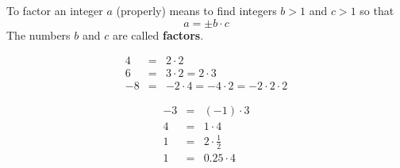 \begin{frame}
\vskip -0.1cm
\begin{definition}
To factor an integer $a$ (properly) means to find integers $b > 1$ and $c > 1$ so that 
\[
a = \pm b\cdot c
\]
The numbers $b$ and $c$ are called \textbf{factors}.
\end{definition}
\begin{example}
\[
\begin{array}{rcl}
4&=& 2\cdot 2\\
6&=& 3\cdot 2 = 2\cdot 3\\
-8&=&- 2\cdot 4= - 4\cdot 2 =- 2\cdot 2\cdot 2
\end{array}
\]
\end{example}
\begin{example}
\[
\begin{array}{rcl}
\displaystyle -3 &=&\displaystyle  (-1)\cdot 3\\
\displaystyle 4 &=&\displaystyle  1 \cdot 4\\
\displaystyle 1 &=&\displaystyle  2\cdot \frac{1}{2}\\
\displaystyle 1&=&\displaystyle  0.25 \cdot 4 
\end{array}
\]

\end{example}
\end{frame}
